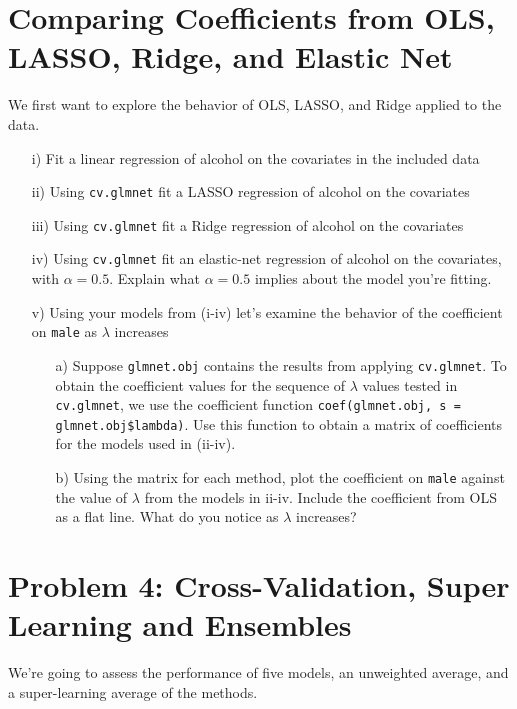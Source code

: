 \documentclass[letterpaper,12pt]{article}
\numberwithin{equation}{section}
\numberwithin{equation}{section}
\begin{document}
\section{Comparing Coefficients from OLS, LASSO, Ridge, and Elastic Net}

We first want to explore the behavior of OLS, LASSO, and Ridge applied to the data.  

\begin{itemize}
\item[i)] Fit a linear regression of alcohol on the covariates in the included data
\item[ii)] Using {\tt cv.glmnet} fit a LASSO regression of alcohol on the covariates
\item[iii)] Using {\tt cv.glmnet} fit a Ridge regression of alcohol on the covariates
\item[iv)] Using {\tt cv.glmnet} fit an elastic-net regression of alcohol on the covariates, with $\alpha = 0.5$.  Explain what $\alpha = 0.5$ implies about the model you're fitting.  
\item[v)] Using your models from (i-iv) let's examine the behavior of the coefficient on {\tt male} as $\lambda$ increases
\begin{itemize}
\item[a)] Suppose {\tt glmnet.obj} contains the results from applying {\tt cv.glmnet}.  To obtain the coefficient values for the sequence of $\lambda$ values tested in {\tt cv.glmnet}, we use the coefficient function {\tt coef(glmnet.obj, s = glmnet.obj\$lambda)}.  Use this function to obtain a matrix of coefficients for the models used in (ii-iv).  
\item[b)] Using the matrix for each method, plot the coefficient on {\tt male} against the value of $\lambda$ from the models in ii-iv.  Include the coefficient from OLS as a flat line.  What do you notice as $\lambda$ increases?  
\end{itemize} 
\end{itemize}

\section{Problem 4: Cross-Validation, Super Learning and Ensembles}

We're going to assess the performance of five models, an unweighted average, and a super-learning average of the methods.
\end{document}
